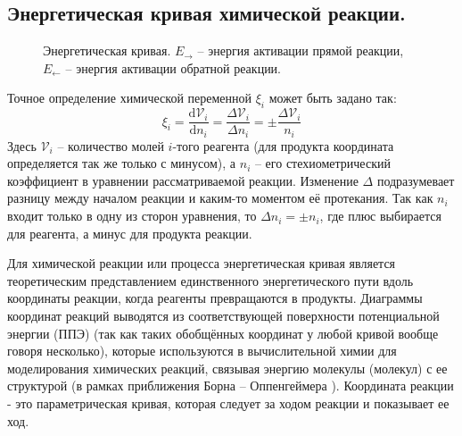 \subsection{Энергетическая кривая химической реакции. }
\begin{figure}[H]
\centering
{}
\caption{Энергетическая кривая. $E_{\longrightarrow}$ -- энергия активации прямой реакции, $E_{\longleftarrow}$ -- энергия активации обратной реакции.}
\label{fig:energycurve}
\end{figure}
Точное определение химической переменной $\xi_{i}$ может быть задано так:
\begin{equation}
    \xi_{i} = \frac{\mathrm{d}\mathcal{V}_{i}}{\mathrm{d}n_{i}} = \frac{\Delta \mathcal{V}_{i}}{\Delta n_{i}} = \pm\frac{\Delta \mathcal{V}_{i}}{n_{i}}
\end{equation}
Здесь $\mathcal{V}_{i}$ -- количество молей $i$-того реагента (для продукта координата определяется так же только с минусом), а $n_{i}$ -- его стехиометрический коэффициент в уравнении рассматриваемой реакции. Изменение $\Delta$ подразумевает разницу между началом реакции и каким-то моментом её протекания. Так как $n_{i}$ входит только  в одну из сторон уравнения, то $\Delta n_{i} = \pm n_{i} $, где плюс выбирается для реагента, а минус для продукта реакции.

Для химической реакции или процесса энергетическая кривая  является теоретическим представлением единственного энергетического пути вдоль координаты реакции, когда реагенты превращаются в продукты. Диаграммы координат реакций выводятся из соответствующей поверхности потенциальной энергии (ППЭ) (так как таких обобщённых координат у любой кривой вообще говоря несколько), которые используются в вычислительной химии для моделирования химических реакций, связывая энергию молекулы (молекул) с ее структурой (в рамках приближения Борна – Оппенгеймера ). Координата реакции - это параметрическая кривая, которая следует за ходом реакции и показывает ее ход.


